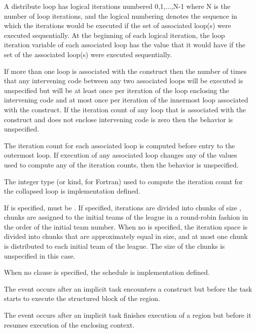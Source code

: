 A distribute loop has logical iterations numbered 0,1,...,N-1 where N
is the number of loop iterations, and the logical numbering denotes
the sequence in which the iterations would be executed if the set of
associated loop(s) were executed sequentially.  At the beginning of
each logical iteration, the loop iteration variable of each associated
loop has the value that it would have if the set of the associated
loop(s) were executed sequentially.

If more than one loop is associated with the 
construct then the number of times that any intervening code between
any two associated loops will be executed is unspecified but will be
at least once per iteration of the loop enclosing the intervening code
and at most once per iteration of the innermost loop associated with
the construct.  If the iteration count of any loop that is associated with the
 construct and does not enclose intervening code is zero
then the behavior is unspecified.


The iteration count for each associated loop is computed before entry to the outermost loop. If execution of any associated loop changes any of the values used to compute any of the iteration counts, then the behavior is unspecified.

The integer type (or kind, for Fortran) used to compute the iteration count for the collapsed loop is implementation defined.

If  is specified,  must be . If specified, iterations are
divided into chunks of size , chunks are assigned to the
initial teams of the league in
a round-robin fashion in the order of the initial team number. When no  is specified,
the iteration space is divided into chunks that are approximately equal in size, and at
most one chunk is distributed to each initial team of the league. The size of the
chunks is unspecified in this case.

When no  clause is specified, the schedule is implementation defined.

\events

The  event occurs after an implicit task encounters a
 construct but before the task starts to execute the structured
block of the  region.

The  event occurs after an implicit task finishes execution of
a  region but before it resumes execution of the enclosing context.

